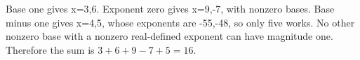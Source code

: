 Base one gives x=3,6. Exponent zero gives x=9,-7, with nonzero bases. Base minus one gives x=4,5, whose exponents are -55,-48, so only five works. No other nonzero base with a nonzero real-defined exponent can have magnitude one. Therefore the sum is $3+6+9-7+5=\boxed{16}$.

